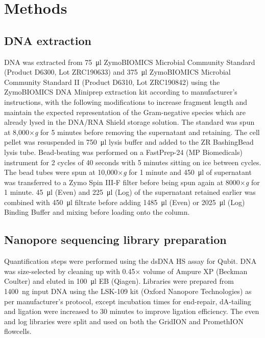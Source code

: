 \documentclass[a4paper,num-refs]{oup-contemporary}
\begin{document}
\section{Methods}

\subsection{DNA extraction}

DNA was extracted from \SI{75}{\micro\litre} ZymoBIOMICS Microbial Community Standard (Product D6300, Lot ZRC190633) and \SI{375}{\micro\litre} ZymoBIOMICS Microbial Community Standard II (Product D6310, Lot ZRC190842) using the ZymoBIOMICS DNA Miniprep extraction kit according to manufacturer's instructions, with the following modifications to increase fragment length and maintain the expected representation of the Gram-negative species which are already lysed in the DNA/RNA Shield storage solution.
The standard was spun at 8,000$\times$\textit{g} for 5 minutes before removing the supernatant and retaining. The cell pellet was resuspended in \SI{750}{\micro\litre} lysis buffer and added to the ZR BashingBead lysis tube. Bead-beating was performed on a FastPrep-24 (MP Biomedicals) instrument for 2 cycles of 40 seconds with 5 minutes sitting on ice between cycles. The bead tubes were spun at 10,000$\times$\textit{g} for 1 minute and \SI{450}{\micro\litre} of supernatant was transferred to a Zymo Spin III-F filter before being spun again at 8000$\times$\textit{g} for 1 minute.
\SI{45}{\micro\litre} (Even) and \SI{225}{\micro\litre} (Log) of the supernatant retained earlier was combined with \SI{450}{\micro\litre} filtrate before adding \SI{1485}{\micro\litre} (Even) or \SI{2025}{\micro\litre} (Log) Binding Buffer and mixing before loading onto the column.

\subsection{Nanopore sequencing library preparation}

Quantification steps were performed using the dsDNA HS assay for Qubit. 
DNA was size-selected by cleaning up with 0.45$\times$ volume of Ampure XP (Beckman Coulter) and eluted in \SI{100}{\micro\litre} EB (Qiagen). Libraries were prepared from \SI{1400}{\nano\gram} input DNA using the LSK-109 kit (Oxford Nanopore Technologies) as per manufacturer's protocol, except incubation times for end-repair, dA-tailing and ligation were increased to 30 minutes to improve ligation efficiency. The even and log libraries were split and used on both the GridION and PromethION flowcells.
\end{document}

